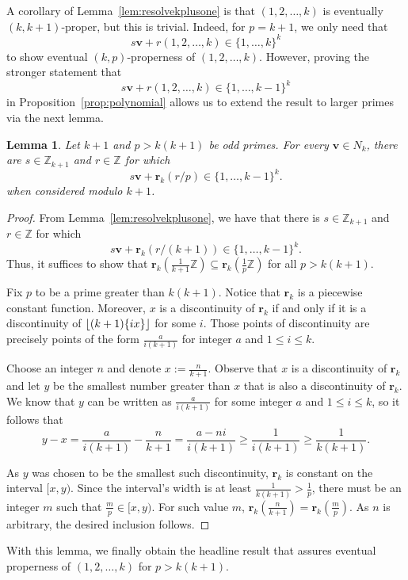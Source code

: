 \documentclass[11pt]{amsart}
\DeclarePairedDelimiter\fracpart{\{}{\}}
\newcommand{\Z}{\mathbb{Z}}
\newcommand{\rbf}{\mathbf{r}}
\newcommand{\vbf}{\mathbf{v}}
\newcommand{\onetok}{(1, 2, \dots, k)}
\newtheorem{lemma}[theorem]{Lemma}
\theoremstyle{definition}
\theoremstyle{remark}
\begin{document}
A corollary of Lemma~\ref{lem:resolvekplusone} is that $\onetok$ is eventually $(k,k+1)$-proper, but this is trivial.
Indeed, for $p=k+1$, we only need that \[s\vbf + r\onetok  \in  \{1,\ldots,k\}^k\] 
to show eventual $(k, p)$-properness of $\onetok$.
However, proving the stronger statement that 
\[s\vbf + r\onetok  \in  \{1,\ldots,k-1\}^k\]
in Proposition~\ref{prop:polynomial} allows us to extend the result to larger primes via the next lemma.

\begin{lemma}
\label{lem:resolvep}
    Let $k+1$ and $p > k(k+1)$ be odd primes. For every $\vbf \in N_k$,
    there are $s \in \Z_{k+1}$ and $r \in \Z$ for which 
    \[ s\vbf + \rbf_k(r/p) \in \{1,\ldots,k-1\}^k .\] 
    when considered modulo $k+1$.
\end{lemma}
\begin{proof}
  From Lemma~\ref{lem:resolvekplusone}, we have that there is $s \in \Z_{k+1}$ and $r \in \Z$ for which
    \[ s\vbf + \rbf_k(r/(k+1)) \in \{1,\ldots,k-1\}^k.\]
  Thus, it suffices to show that $\rbf_k(\tfrac{1}{k+1} \Z) \subseteq \rbf_k(\tfrac{1}{p} \Z)$ for all $p>k(k+1)$.

  Fix $p$ to be a prime greater than $k(k+1)$. Notice that $\rbf_k$ is a piecewise constant function. Moreover, 
  $x$ is a discontinuity of $\rbf_k$ if and only if it is a discontinuity of $\left\lfloor (k+1) \fracpart{ix} \right\rfloor$ for some $i$.
  Those points of discontinuity are precisely points of the form  $\frac{a}{i(k+1)}$ for integer $a$ and $1 \le i \le k$.

  Choose an integer $n$ and denote $x := \tfrac{n}{k+1}$. Observe that $x$ is a discontinuity of $\rbf_k$ and let $y$ be 
  the smallest number greater than $x$ that is also a discontinuity of $\rbf_k$. We know that $y$ can be written as 
  $\tfrac{a}{i(k+1)}$ for some integer $a$ and $1 \le i \le k$, so it follows that 
  \[ y - x = \frac{a}{i(k+1)} - \frac{n}{k+1} = \frac{a - ni}{i(k+1)} \ge \frac{1}{i(k+1)} \ge \frac{1}{k(k+1)}. \]

  As $y$ was chosen to be the smallest such discontinuity, $\rbf_k$ is constant on the interval $[x, y)$. 
  Since the interval's width is at least $\tfrac{1}{k(k+1)} > \tfrac{1}{p}$, 
  there must be an integer $m$ such that $\tfrac{m}{p} \in [x, y)$.
  For such value $m$, $\rbf_k (\frac{n}{k+1}) = \rbf_k (\frac{m}{p})$.
  As $n$ is arbitrary, the desired inclusion follows.
\end{proof}

With this lemma, we finally obtain the headline result that assures eventual properness of $\onetok$ for $p > k(k+1)$.
\end{document}
